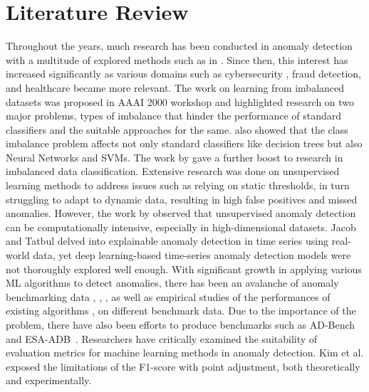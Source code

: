 \section{Literature Review}
\label{sec:a5}
Throughout the years, much research has been conducted in anomaly detection with a multitude of explored methods such as in \cite{I31, I51, I37, I38, I22, I39, I40, I41}. Since then, this interest has increased significantly as various domains such as cybersecurity \cite{I17, I18}, fraud detection, and healthcare \cite{I20, I21} became more relevant. 
The work on learning from imbalanced datasets was proposed in AAAI 2000 workshop 
and highlighted research on two major problems, types of imbalance that hinder the performance of standard classifiers and the suitable approaches for the same. \cite{I68} also showed that the class imbalance problem affects not only standard classifiers like decision trees but also Neural Networks and SVMs. The work by \cite{I66,I67}
gave a further boost to research in imbalanced data classification. Extensive research was done on unsupervised learning methods to address issues such as relying on static thresholds, in turn struggling to adapt to dynamic data, resulting in high false positives and missed anomalies. However, the work by \cite{I70} observed that unsupervised anomaly detection can be computationally intensive, especially in high-dimensional datasets. Jacob and Tatbul \cite{I71} delved into explainable anomaly detection in time series using real-world data, yet deep learning-based time-series anomaly detection models were not thoroughly explored well enough. %
With significant growth in applying various ML algorithms
to detect anomalies, there has been an avalanche of anomaly
benchmarking data \cite{I43}, \cite{I18}, \cite{I72}, as well as empirical studies of the performances of existing algorithms \cite{I73}, \cite{I74} on different benchmark data. Due to the importance of the problem, there have also been efforts to produce benchmarks such as AD-Bench~\cite{I43} and ESA-ADB~\cite{I44}. %
Researchers have critically examined the suitability of evaluation metrics for machine learning methods in anomaly detection. Kim et al. \cite{I76} exposed the limitations of the F1-score with point adjustment, both theoretically and experimentally. 

